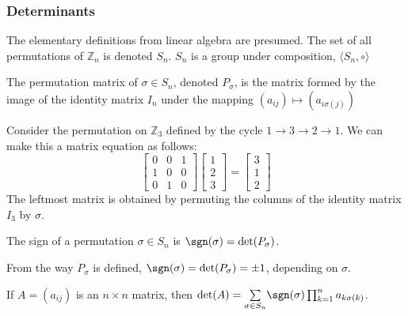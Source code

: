 \documentclass[crop=false,class=article,oneside]{standalone}
\begin{document}
            \subsubsection{Determinants}
            The elementary definitions from linear algebra are presumed. The set of all permutations of $\mathbb{Z}_{n}$ is denoted $S_n$. $S_{n}$ is a group under composition, $\langle S_{n},\circ\rangle$
            \begin{definition}
            The permutation matrix of $\sigma \in S_{n}$, denoted $P_{\sigma}$, is the matrix formed by the image of the identity matrix $I_{n}$ under the mapping $(a_{ij})\mapsto (a_{i\sigma(j)})$
            \end{definition}
            \begin{example}
            Consider the permutation on $\mathbb{Z}_3$ defined by the cycle $1\rightarrow 3 \rightarrow 2 \rightarrow 1$. We can make this a matrix equation as follows:
            \begin{equation*}
                \begin{bmatrix} 0 & 0 & 1 \\ 1 & 0 & 0 \\ 0 & 1 & 0 \end{bmatrix} \begin{bmatrix} 1 \\ 2 \\ 3 \end{bmatrix} = \begin{bmatrix} 3 \\ 1 \\ 2 \end{bmatrix}    
            \end{equation*}
            The leftmost matrix is obtained by permuting the columns of the identity matrix $I_{3}$ by $\sigma$.
            \end{example}
            \begin{definition}
            The sign of a permutation $\sigma\in S_{n}$ is $\sgn(\sigma) = \det(P_{\sigma})$.
            \end{definition}
            \begin{remark}
            From the way $P_{\sigma}$ is defined, $\sgn(\sigma) = \det(P_{\sigma}) = \pm 1$, depending on $\sigma$.
            \end{remark}
            \begin{theorem}
            If $A=(a_{ij})$ is an $n\times n$ matrix, then $\det(A) = \underset{\sigma \in S_n}\sum \sgn(\sigma) \prod_{k=1}^{n} a_{k\sigma(k)}$.
            \end{theorem}
\end{document}
